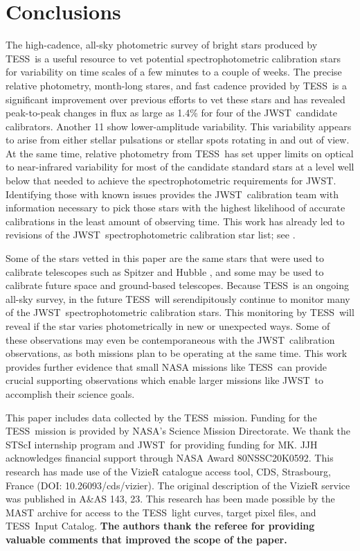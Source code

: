 \documentclass[twocolumn, linenumbers]{aastex631}
\newcommand{\webb}{JWST}
\newcommand{\jwst}{JWST}
\newcommand{\tess}{TESS}
\begin{document}
\section{Conclusions} %
\label{sec:conclusion}

The high-cadence, all-sky photometric survey of bright stars produced by \tess\ is a useful resource to vet potential spectrophotometric calibration stars for variability on time scales of a few minutes to a couple of weeks. The precise relative photometry, month-long stares, and fast cadence provided by \tess\ is a significant improvement over previous efforts to vet these stars and has revealed peak-to-peak changes in flux as large as 1.4\% for four of the \webb\ candidate calibrators. Another 11 show lower-amplitude variability. This variability appears to arise from either stellar pulsations or stellar spots rotating in and out of view. At the same time, relative photometry from \tess\ has set upper limits on optical to near-infrared variability for most of the candidate standard stars at a level well below that needed to achieve the spectrophotometric requirements for \jwst.  Identifying those with known issues provides the \webb\ calibration team with information necessary to pick those stars with the highest likelihood of accurate calibrations in the least amount of observing time. This work has already led to revisions of the \webb\ spectrophotometric calibration star list; see \citet{Gordon2022inprep}.

Some of the stars vetted in this paper are the same stars that were used to calibrate telescopes such as Spitzer \citep{Reach2005} and Hubble \citep{Bohlin2011AJ}, and some may be used to calibrate future space and ground-based telescopes.  Because \tess\ is an ongoing all-sky survey, in the future \tess\ will serendipitously continue to monitor many of the \webb\ spectrophotometric calibration stars. This monitoring by \tess\ will reveal if the star varies photometrically in new or unexpected ways.  Some of these observations may even be contemporaneous with the \webb\ calibration observations, as both missions plan to be operating at the same time.  This work provides further evidence that small NASA missions like \tess\ can provide crucial supporting observations which enable larger missions like \jwst\ to accomplish their science goals.

\begin{acknowledgments}
This paper includes data collected by the \tess\ mission. Funding for the \tess\ mission is provided by NASA's Science Mission Directorate. We thank the STScI internship program and \jwst\ for providing funding for MK. JJH acknowledges financial support through NASA Award 80NSSC20K0592. This research has made use of the VizieR catalogue access tool, CDS, Strasbourg, France (DOI: 10.26093/cds/vizier). The original description of the VizieR service was published in A\&AS 143, 23. This research has been made possible by the MAST archive for access to the \tess\ light curves, target pixel files, and \tess\ Input Catalog. \textbf{The authors thank the referee for providing valuable comments that improved the scope of the paper.}
\end{acknowledgments}
\end{document}
